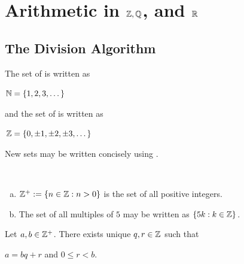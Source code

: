 \documentclass[11pt,fleqn,dvipsnames,usenames]{article}
\renewcommand{\headrulewidth}{1pt}
\newcommand{\p}{\noindent}
\begin{document}
\fancyhead[L]{\course}
\fancyhead[R]{\term}
\renewcommand{\headrulewidth}{0.4pt}


\setcounter{section}{0}
\section{Arithmetic in \texorpdfstring{$\mathbb{Z}, \mathbb{Q}$, and $\mathbb{R}$}{Z, Q, and R}}
\setcounter{subsection}{0}
\subsection{The Division Algorithm}

\p The set of  is written as
\begin{center}
$\mathbb{N} = \left\{1,2,3,\dots\right\}$
\end{center}
and the set of  is written as
\begin{center}
\item $\mathbb{Z} = \left\{0, \pm 1, \pm 2,\pm 3,\dots\right\}$
\end{center}
\vsp

\p New sets may be written concisely using .
\vsp

\begin{examples*}~
\begin{enumerate}[(a)]
\item $\mathbb{Z}^{+} := \left\{n\in \mathbb{Z}: n > 0\right\}$ is the set of all positive integers.
\item The set of all multiples of $5$ may be written as $\left\{5k:k\in\mathbb{Z}\right\}$.
\end{enumerate}
\end{examples*}
\vsp

\begin{theorem*} Let $a,b\in\mathbb{Z}^{+}$.  There exists unique $q,r\in\mathbb{Z}$ such that
\begin{center}
$a = bq + r$ and $0\leq r < b$.
\end{center}
\end{theorem*}
%

\begin{example*}~

\vspace{2cm}

\end{example*}
\end{document}
